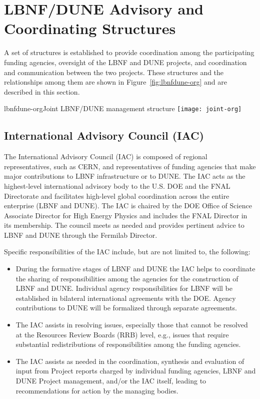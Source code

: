 \section{LBNF/DUNE Advisory and Coordinating Structures}
\label{sec:lbnf-dune-interface}

A set of structures is established to provide coordination among the participating funding agencies, oversight of the LBNF and DUNE projects, and coordination and communication between the two projects.  These structures and the relationships among them are shown in Figure~\ref{fig:lbnfdune-org} and are described in this section.

\begin{cdrfigure}{lbnfdune-org}{Joint LBNF/DUNE management structure}
  \texttt{[image: joint-org]}
\end{cdrfigure}


\subsection{International Advisory Council (IAC) }

The International Advisory Council (IAC) is composed of
regional representatives, such as CERN, and representatives of
funding agencies that make major contributions to LBNF infrastructure or to DUNE. The IAC 
acts as the highest-level international advisory body to the U.S.
DOE and the FNAL Directorate and facilitates
high-level global coordination across the entire enterprise (LBNF and DUNE).
The IAC is chaired by the DOE Office of Science Associate Director
for High Energy Physics and includes the FNAL Director in its membership.  
The council meets as needed and provides pertinent advice to 
LBNF and DUNE  
through the Fermilab Director.  


Specific responsibilities of the IAC include, but are not limited to,
the following:


\begin{itemize}
\item During the formative stages of LBNF and DUNE
the IAC helps to coordinate the sharing of responsibilities among
the agencies for the construction of LBNF and DUNE.
Individual agency responsibilities for LBNF will be established in
bilateral international agreements with the DOE. Agency contributions to
DUNE will be formalized through separate agreements.

\item The IAC assists in resolving issues, especially those
that cannot be resolved at the Resources Review Boards (RRB) level,
e.g., issues that require substantial redistributions of
responsibilities among the funding agencies.

\item The IAC assists as needed in the coordination,
synthesis and evaluation of input from Project reports charged by
individual funding agencies, LBNF and DUNE Project management,
and/or the IAC itself, leading to recommendations for action by
the managing bodies.
\end{itemize}

